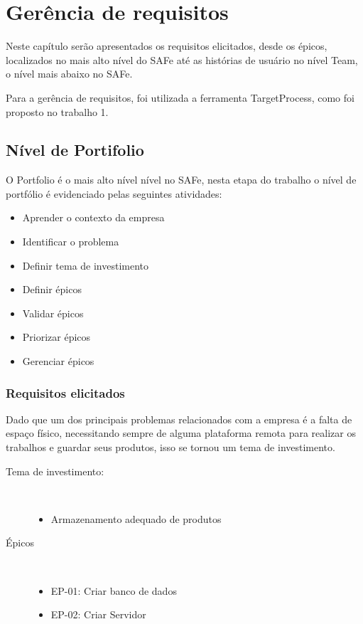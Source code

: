 \chapter{Gerência de requisitos}

  Neste capítulo serão apresentados os requisitos elicitados, desde os épicos, localizados no mais alto nível do SAFe até as
  histórias de usuário no nível Team, o nível mais abaixo no SAFe.

  Para a gerência de requisitos, foi utilizada a ferramenta TargetProcess, como foi proposto no trabalho 1.

\section{Nível de Portifolio}

  O Portfolio é o mais alto nível nível no SAFe, nesta etapa do trabalho o nível de portfólio é evidenciado pelas seguintes atividades:

  \begin{itemize}
    \item Aprender o contexto da empresa
    \item Identificar o problema
    \item Definir tema de investimento
    \item Definir épicos
    \item Validar épicos
    \item Priorizar épicos
    \item Gerenciar épicos
  \end{itemize}

\subsection{Requisitos elicitados}

  Dado que um dos principais problemas relacionados com a empresa é a falta de espaço físico, necessitando sempre de alguma plataforma remota
  para realizar os trabalhos e guardar seus produtos, isso se tornou um tema de investimento.

  \begin{description}
    \item[Tema de investimento:] \
      \begin{itemize}
        \item Armazenamento adequado de produtos
      \end{itemize}
    \item[Épicos] \
      \begin{itemize}
        \item EP-01: Criar banco de dados
        \item EP-02: Criar Servidor
      \end{itemize}
  \end{description}

